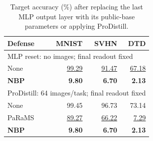 \begin{table}[!htbp]
\centering
\small
\setlength{\tabcolsep}{4pt}
\caption{Target accuracy (\%) after replacing the last MLP output layer with its public-base parameters or applying ProDistill.}
\label{tab:recovery}
\begin{tabular}{lrrr}
\toprule
Defense & MNIST & SVHN & DTD \\
\midrule
\multicolumn{4}{l}{MLP reset: no images; final readout fixed} \\
None & \underline{99.29} & \underline{91.47} & \underline{67.18} \\
\textbf{NBP} & \textbf{9.80} & \textbf{6.70} & \textbf{2.13} \\
\midrule
\multicolumn{4}{l}{ProDistill: 64 images/task; final readout fixed} \\
None & 99.45 & 96.73 & 73.14 \\
PaRaMS~\cite{wei2025params} & \underline{89.27} & \underline{66.22} & \underline{7.29} \\
\textbf{NBP} & \textbf{9.80} & \textbf{6.70} & \textbf{2.13} \\
\bottomrule
\end{tabular}
\end{table}
